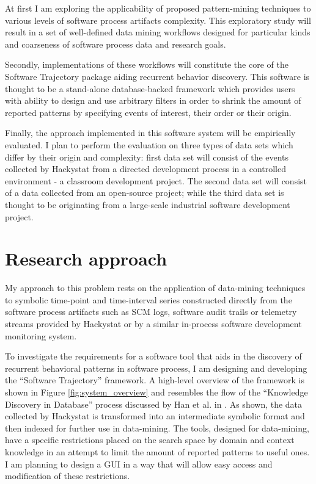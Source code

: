 \documentclass{sig-alternate}
\begin{document}
At first I am exploring the applicability of proposed pattern-mining techniques to various levels of software process artifacts complexity. This exploratory study will result in a set of well-defined data mining workflows designed for particular kinds and coarseness of software process data and research goals. 

Secondly, implementations of these workflows will constitute the core of the Software Trajectory package aiding recurrent behavior discovery. This software is thought to be a stand-alone database-backed framework which provides users with ability to design and use arbitrary filters in order to shrink the amount of reported patterns by specifying events of interest, their order or their origin.  

Finally, the approach implemented in this software system will be empirically evaluated. I plan to perform the evaluation on three types of data sets which differ by their origin and complexity: first data set will consist of the events collected by Hackystat from a directed development process in a controlled environment - a classroom development project. The second data set will consist of a data collected from an open-source project; while the third data set is thought to be originating from a large-scale industrial software development project. 

\section{Research approach}
My approach to this problem rests on the application of data-mining techniques to symbolic time-point and time-interval series constructed directly from the software process artifacts such as SCM logs, software audit trails or telemetry streams provided by Hackystat or by a similar in-process software development monitoring system.

To investigate the requirements for a software tool that aids in the discovery of recurrent behavioral patterns in software process, I am designing and developing the ``Software Trajectory'' framework. A high-level overview of the framework is shown in Figure \ref{fig:system_overview} and resembles the flow of the ``Knowledge Discovery in Database'' process discussed by Han et al. in \cite{citeulike:709476}. As shown, the data collected by Hackystat is transformed into an intermediate symbolic format and then indexed for further use in data-mining. The tools, designed for data-mining, have a specific restrictions placed on the search space by domain and context knowledge in an attempt to limit the amount of reported patterns to useful ones. I am planning to design a GUI in a way that will allow easy access and modification of these restrictions.
\end{document}
